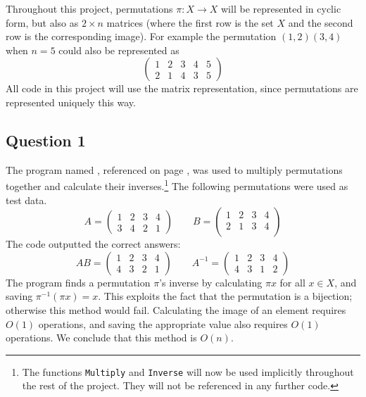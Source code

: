 \documentclass[10pt,a4paper,notitlepage]{article}
\author{Jonah Gibbon}
\begin{document}
Throughout this project, permutations $\pi :X\rightarrow X$ will be represented in cyclic form, but also as $2\times n$ matrices (where the first row is the set $X$ and the second row is the corresponding image). For example the permutation $(1,2)(3,4)$ when $n=5$ could also be represented as
\begin{equation*}
\begin{pmatrix}
1&2&3&4&5\\
2&1&4&3&5
\end{pmatrix}
\end{equation*}
All code in this project will use the matrix representation, since permutations are represented uniquely this way.
\subsection*{\centering Question 1}
The program named , referenced on page \pageref{cd:1}, was used to multiply permutations together and calculate their inverses.\footnote{The functions \texttt{Multiply} and \texttt{Inverse} will now be used implicitly throughout the rest of the project. They will not be referenced in any further code.} The following permutations were used as test data.
\begin{equation*}
A=\begin{pmatrix}
1&2&3&4\\
3&4&2&1
\end{pmatrix} \quad\quad
B=\begin{pmatrix}
1&2&3&4\\
2&1&3&4\\
\end{pmatrix}
\end{equation*}
The code outputted the correct answers:
\begin{equation*}
AB=\begin{pmatrix}
1&2&3&4\\
4&3&2&1
\end{pmatrix}
\quad\quad
A^{-1}=\begin{pmatrix}
1&2&3&4\\
4&3&1&2
\end{pmatrix}
\end{equation*}
The program finds a permutation $\pi$'s inverse by calculating $\pi x$ for all $x\in X$, and saving $\pi^{-1}(\pi x)=x$. This exploits the fact that the permutation is a bijection; otherwise this method would fail. Calculating the image of an element requires $O(1)$ operations, and saving the appropriate value also requires $O(1)$ operations. We conclude that this method is $O(n)$.
\end{document}

